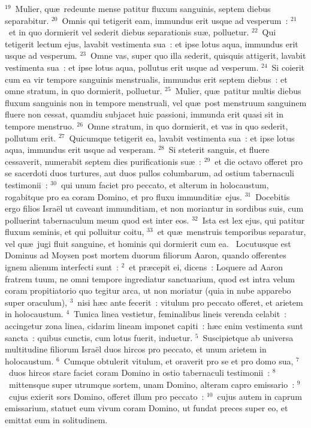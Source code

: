 ${}^{19}$~Mulier, qu\ae\ redeunte mense patitur fluxum sanguinis, septem diebus separabitur.
${}^{20}$~Omnis qui tetigerit eam, immundus erit usque ad vesperum~:
${}^{21}$~et in quo dormierit vel sederit diebus separationis su\ae , polluetur.
${}^{22}$~Qui tetigerit lectum ejus, lavabit vestimenta sua~: et ipse lotus aqua, immundus erit usque ad vesperum.
${}^{23}$~Omne vas, super quo illa sederit, quisquis attigerit, lavabit vestimenta sua~: et ipse lotus aqua, pollutus erit usque ad vesperum.
${}^{24}$~Si coierit cum ea vir tempore sanguinis menstrualis, immundus erit septem diebus~: et omne stratum, in quo dormierit, polluetur.
${}^{25}$~Mulier, qu\ae\ patitur multis diebus fluxum sanguinis non in tempore menstruali, vel qu\ae\ post menstruum sanguinem fluere non cessat, quamdiu subjacet huic passioni, immunda erit quasi sit in tempore menstruo.
${}^{26}$~Omne stratum, in quo dormierit, et vas in quo sederit, pollutum erit.
${}^{27}$~Quicumque tetigerit ea, lavabit vestimenta sua~: et ipse lotus aqua, immundus erit usque ad vesperam.
${}^{28}$~Si steterit sanguis, et fluere cessaverit, numerabit septem dies purificationis su\ae~:
${}^{29}$~et die octavo offeret pro se sacerdoti duos turtures, aut duos pullos columbarum, ad ostium tabernaculi testimonii~:
${}^{30}$~qui unum faciet pro peccato, et alterum in holocaustum, rogabitque pro ea coram Domino, et pro fluxu immunditi\ae\ ejus.
${}^{31}$~Docebitis ergo filios Isra\"el ut caveant immunditiam, et non moriantur in sordibus suis, cum polluerint tabernaculum meum quod est inter eos.
${}^{32}$~Ista est lex ejus, qui patitur fluxum seminis, et qui polluitur coitu,
${}^{33}$~et qu\ae\ menstruis temporibus separatur, vel qu\ae\ jugi fluit sanguine, et hominis qui dormierit cum ea.
~Locutusque est Dominus ad Moysen post mortem duorum filiorum Aaron, quando offerentes ignem alienum interfecti sunt~:
${}^{2}$~et pr\ae cepit ei, dicens~: Loquere ad Aaron fratrem tuum, ne omni tempore ingrediatur sanctuarium, quod est intra velum coram propitiatorio quo tegitur arca, ut non moriatur (quia in nube apparebo super oraculum),
${}^{3}$~nisi h\ae c ante fecerit~: vitulum pro peccato offeret, et arietem in holocaustum.
${}^{4}$~Tunica linea vestietur, feminalibus lineis verenda celabit~: accingetur zona linea, cidarim lineam imponet capiti~: h\ae c enim vestimenta sunt sancta~: quibus cunctis, cum lotus fuerit, induetur.
${}^{5}$~Suscipietque ab universa multitudine filiorum Isra\"el duos hircos pro peccato, et unum arietem in holocaustum.
${}^{6}$~Cumque obtulerit vitulum, et oraverit pro se et pro domo sua,
${}^{7}$~duos hircos stare faciet coram Domino in ostio tabernaculi testimonii~:
${}^{8}$~mittensque super utrumque sortem, unam Domino, alteram capro emissario~:
${}^{9}$~cujus exierit sors Domino, offeret illum pro peccato~:
${}^{10}$~cujus autem in caprum emissarium, statuet eum vivum coram Domino, ut fundat preces super eo, et emittat eum in solitudinem.


